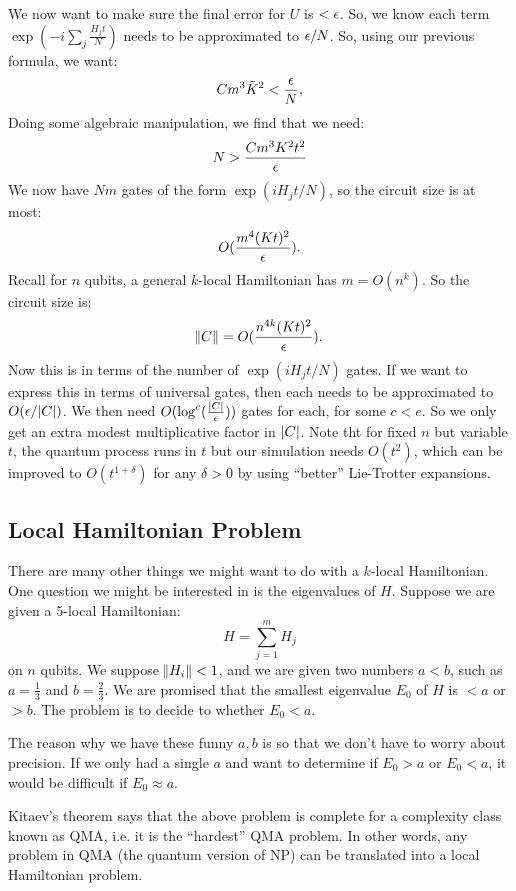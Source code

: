 We now want to make sure the final error for $U$ is $< \epsilon$. So, we know each term $\exp(-i\sum_j \frac{H_j t}{N})$ needs to be approximated to $\epsilon/N$. So, using our previous formula, we want:
\begin{equation}
    Cm^3\tilde{K}^2 < \frac{\epsilon}{N},
\end{equation}
Doing some algebraic manipulation, we find that we need:
\begin{equation}
    N > \frac{Cm^3K^2t^2}{\epsilon}
\end{equation}
We now have $Nm$ gates of the form $\exp(iH_jt/N)$, so the circuit size is at most:
\begin{equation}
    O(\frac{m^4(Kt)^2}{\epsilon}).
\end{equation}
Recall for $n$ qubits, a general $k$-local Hamiltonian has $m = O(n^k)$. So the circuit size is:
\begin{equation}
    \norm{C} = O(\frac{n^{4k}(Kt)^2}{\epsilon}).
\end{equation}
Now this is in terms of the number of $\exp(iH_jt/N)$ gates. If we want to express this in terms of universal gates, then each needs to be approximated to $O(\epsilon/\lvert C \rvert)$. We then need $O(\log^c(\frac{\lvert C \rvert}{\epsilon}))$ gates for each, for some $c < e$. So we only get an extra modest multiplicative factor in $\lvert C \rvert$. Note tht for fixed $n$ but variable $t$, the quantum process runs in $t$ but our simulation needs $O(t^2)$, which can be improved to $O(t^{1+\delta})$ for any $\delta > 0$ by using ``better'' Lie-Trotter expansions.

\subsection*{Local Hamiltonian Problem}
There are many other things we might want to do with a $k$-local Hamiltonian. One question we might be interested in is the eigenvalues of $H$. Suppose we are given a 5-local Hamiltonian:
\begin{equation}
    H = \sum_{j=1}^m H_j
\end{equation}
on $n$ qubits. We suppose $\norm{H_i} < 1$, and we are given two numbers $a < b$, such as $a = \frac{1}{3}$ and $b = \frac{2}{3}$. We are promised that the smallest eigenvalue $E_0$ of $H$ is $< a$ or $> b$. The problem is to decide to whether $E_0 < a$. 

The reason why we have these funny $a, b$ is so that we don't have to worry about precision. If we only had a single $a$ and want to determine if $E_0 > a$ or $E_0 < a$, it would be difficult if $E_0 \approx a$. 

Kitaev's theorem says that the above problem is complete for a complexity class known as QMA, i.e. it is the ``hardest'' QMA problem. In other words, any problem in QMA (the quantum version of NP) can be translated into a local Hamiltonian problem. 